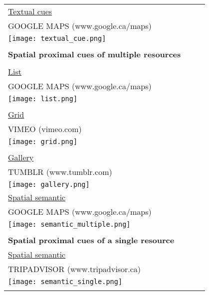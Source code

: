 \begin{longtable}{|p{0.90\linewidth}|}
\underline{Textual cues}                 \\
GOOGLE MAPS (www.google.ca/maps)\\
\texttt{[image: textual\_cue.png]}\\
\\
\hline
\textbf{Spatial proximal cues of multiple resources}  \\
\\
\underline{List}  						\\
GOOGLE MAPS (www.google.ca/maps)\\
\texttt{[image: list.png]}\\
\\
\hline
\pagebreak
\hline
\underline{Grid}   						 \\
VIMEO (vimeo.com)\\
\texttt{[image: grid.png]}\\
\\
\underline{Gallery}  					\\
TUMBLR (www.tumblr.com)\\
\texttt{[image: gallery.png]}\\
\hline
\pagebreak
\hline
\underline{Spatial semantic}            \\
GOOGLE MAPS (www.google.ca/maps)\\
\texttt{[image: semantic\_multiple.png]}\\
\\ 
\textbf{Spatial proximal cues of a single resource} \\
\underline{Spatial semantic}            \\
TRIPADVISOR (www.tripadvisor.ca)\\
\texttt{[image: semantic\_single.png]}\\
\\
\hline

\end{longtable}
\clearpage
